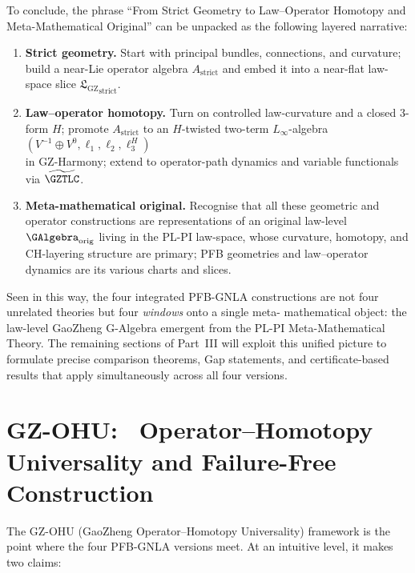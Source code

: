 \documentclass[11pt]{book}
\theoremstyle{plain}
\theoremstyle{definition}
\newcommand{\GZLS}{\ensuremath{\mathfrak{L}_{\mathrm{GZ}}}}       \newcommand{\GZLT}{\ensuremath{M_{!w}}}                           \newcommand{\GZLOC}{\ensuremath{A_M}}                             \newcommand{\GZLCurv}{\ensuremath{\mathcal{F}_{\mathrm{law}}}}
\begin{document}
To conclude, the phrase “From Strict Geometry to Law–Operator Homotopy and \\ Meta-Mathematical Original” can be unpacked as the following
layered narrative:

\begin{enumerate}[label=\arabic*)]
  \item \textbf{Strict geometry.}
        Start with principal bundles, connections, and curvature; build
        a near-Lie operator algebra $A_{\mathrm{strict}}$ and embed it
        into a near-flat law-space slice ${\GZLS}_{\mathrm{strict}}$.
  \item \textbf{Law–operator homotopy.}
        Turn on controlled law-curvature and a closed 3-form $H$;
        promote $A_{\mathrm{strict}}$ to an $H$-twisted two-term
        $L_\infty$-algebra $(V^{-1}\oplus V^0,\ell_1,\ell_2,\ell_3^H)$ \\
        in GZ-Harmony; extend to operator-path dynamics and variable
        functionals via $\widetilde{\GZTLC}$.
  \item \textbf{Meta-mathematical original.}
        Recognise that all these geometric and operator constructions
        are representations of an original law-level \GAlgebra\
        $\GAlgebra_{\mathrm{orig}}$ living in the PL-PI law-space,
        whose curvature, homotopy, and CH-layering structure are
        primary; PFB geometries and law--operator dynamics are its
        various charts and slices.
\end{enumerate}

Seen in this way, the four integrated PFB-GNLA constructions are not
four unrelated theories but four \emph{windows} onto a single meta-
mathematical object: the law-level GaoZheng G-Algebra emergent from the
PL-PI Meta-Mathematical Theory. The remaining sections of Part~III will
exploit this unified picture to formulate precise comparison theorems,
Gap statements, and certificate-based results that apply simultaneously
across all four versions.



\section{GZ-OHU: \ Operator--Homotopy Universality and Failure-Free Construction}


The GZ-OHU (GaoZheng Operator--Homotopy Universality) framework is the
point where the four PFB-GNLA versions meet. At an intuitive level, it
makes two claims:
\end{document}
